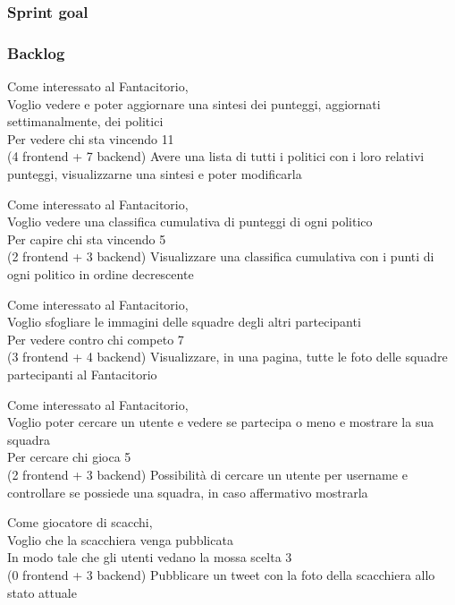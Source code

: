 \subsubsection{Sprint goal}


\subsubsection{Backlog}
\userstory%
{Come interessato al Fantacitorio,\\Voglio vedere e poter aggiornare una sintesi dei punteggi, aggiornati settimanalmente, dei politici\\Per vedere chi sta vincendo}%
{11\\(4 frontend + 7 backend)}%
{Avere una lista di tutti i politici con i loro relativi punteggi, visualizzarne una sintesi e poter modificarla}%
{}

\userstory%
{Come interessato al Fantacitorio,\\Voglio vedere una classifica cumulativa di punteggi di ogni politico\\Per capire chi sta vincendo}%
{5\\(2 frontend + 3 backend)}%
{Visualizzare una classifica cumulativa con i punti di ogni politico in ordine decrescente}%
{}

\userstory%
{Come interessato al Fantacitorio,\\Voglio sfogliare le immagini delle squadre degli altri partecipanti\\Per vedere contro chi competo}%
{7\\(3 frontend + 4 backend)}%
{Visualizzare, in una pagina, tutte le foto delle squadre partecipanti al Fantacitorio}%
{}

\userstory%
{Come interessato al Fantacitorio,\\Voglio poter cercare un utente e vedere se partecipa o meno e mostrare la sua squadra\\Per cercare chi gioca}%
{5\\(2 frontend + 3 backend)}%
{Possibilità di cercare un utente per username e controllare se possiede una squadra, in caso affermativo mostrarla}%
{}

\userstory%
{Come giocatore di scacchi,\\Voglio che la scacchiera venga pubblicata\\In modo tale che gli utenti vedano la mossa scelta}%
{3\\(0 frontend + 3 backend)}%
{Pubblicare un tweet con la foto della scacchiera allo stato attuale}%
{}

